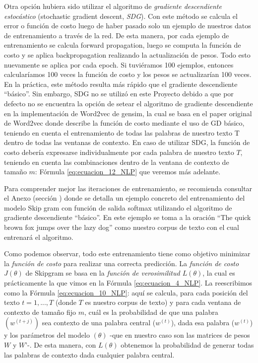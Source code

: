 \documentclass[12pt,a4paper]{article}
\begin{document}
\begin{sloppypar}
Otra opción hubiera sido utilizar el algoritmo de \textit{gradiente descendiente estocástico} (stochastic gradient descent, \textit{SDG}). Con este método se calcula el error o función de costo luego de haber pasado solo un ejemplo de nuestros datos de entrenamiento a través de la red. De esta manera, por cada ejemplo de entrenamiento se calcula forward propagation, luego se computa la función de costo y se aplica backpropagation realizando la actualización de pesos. Todo esto nuevamente se aplica por cada epoch. Si tuviéramos 100 ejemplos, entonces calcularíamos 100 veces la función de costo y los pesos se actualizarían 100 veces. En la práctica, este método resulta más rápido que el gradiente descendiente “básico”. Sin embargo, SDG no se utilizó en este Proyecto debido a que por defecto no se encuentra la opción de setear el algoritmo de gradiente descendiente en la implementación de Word2vec de gensim, la cual se basa en el paper original de Word2vec\cite{NLP_11} donde describe la función de costo mediante el uso de GD básico, teniendo en cuenta el entrenamiento de todas las palabras de nuestro texto T dentro de todas las ventanas de contexto. En caso de utilizar SDG, la función de costo debería expresarse individualmente por cada palabra de nuestro texto $T$, teniendo en cuenta las combinaciones dentro de la ventana de contexto de tamaño $m$: Fórmula \ref{eq:ecuacion_12_NLP} que veremos más adelante.

Para comprender mejor las iteraciones de entrenamiento, se recomienda consultar el Anexo (sección \textit{}) donde se detalla un ejemplo concreto del entrenamiento del modelo Skip gram con función de salida softmax utilizando el algoritmo de gradiente descendiente “básico”. En este ejemplo se toma a la oración “The quick brown fox jumps over the lazy dog” como nuestro corpus de texto con el cual entrenará el algoritmo.

Como podemos observar, todo este entrenamiento tiene como objetivo minimizar la \textit{función de costo} para realizar una correcta predicción. La \textit{función de costo $J(\theta)$} de Skipgram se basa en la \textit{función de verosimilitud $L(\theta)$}, la cual es prácticamente la que vimos en la Fórmula \ref{eq:ecuacion_4_NLP}. La reescribimos como la Fórmula \ref{eq:ecuacion_10_NLP}: aquí se calcula, para cada posición del texto $t = 1, ..., T$ (donde $T$ es nuestro corpus de texto) y para cada ventana de contexto de tamaño fijo $m$, cuál es la probabilidad de que una palabra $(w^{(t+j)})$ sea contexto de una palabra central ($w^{(t)}$), dada esa palabra ($w^{(t)}$) y los parámetros del modelo $(\theta)$ -que en nuestro caso son las matrices de pesos $W$ y $W’$-. De esta manera, con $L(\theta)$ obtenemos la probabilidad de generar todas las palabras de contexto dada cualquier palabra central.


\end{sloppypar}
\end{document}
